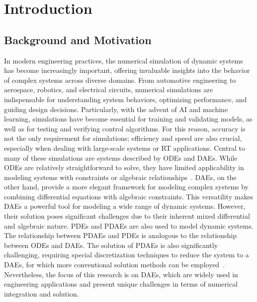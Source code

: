 
\chapter{Introduction}
\label{chap1:introduction}


\section{Background and Motivation}

In modern engineering practices, the numerical simulation of dynamic systems has become increasingly important, offering invaluable insights into the behavior of complex systems across diverse domains. From automotive engineering to aerospace, robotics, and electrical circuits, numerical simulations are indispensable for understanding system behaviors, optimizing performance, and guiding design decisions. Particularly, with the advent of \ac{AI} and machine learning, simulations have become essential for training and validating models, as well as for testing and verifying control algorithms. For this reason, accuracy is not the only requirement for simulations; efficiency and speed are also crucial, especially when dealing with large-scale systems or \ac{RT} applications. Central to many of these simulations are systems described by \acp{ODE} and \acp{DAE}. While \acp{ODE} are relatively straightforward to solve, they have limited applicability in modeling systems with constraints or algebraic relationships~\cite{brenan1995numerical}. \acp{DAE}, on the other hand, provide a more elegant framework for modeling complex systems by combining differential equations with algebraic constraints. This versatility makes \acp{DAE} a powerful tool for modeling a wide range of dynamic systems. However, their solution poses significant challenges due to their inherent mixed differential and algebraic nature. \acp{PDE} and \acp{PDAE} are also used to model dynamic systems. The relationship between \acp{PDAE} and \acp{PDE} is analogous to the relationship between \acp{ODE} and \acp{DAE}. The solution of \acp{PDAE} is also significantly challenging, requiring special discretization techniques to reduce the system to a \acp{DAE}, for which more conventional solution methods can be employed~\cite{dedieuleveult2009global}. Nevertheless, the focus of this research is on \acp{DAE}, which are widely used in engineering applications and present unique challenges in terms of numerical integration and solution.

